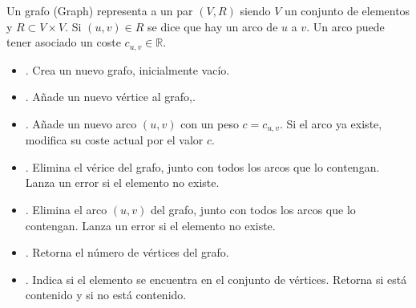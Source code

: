 

\begin{definition}[Grafo]{}\label{def:Grafo}

Un grafo  (Graph) representa a un par $(V, R)$ siendo $V$ un conjunto de elementos y $R\subset V\times V$.
Si $(u, v)\in R$ se dice que hay un arco de $u$ a $v$. Un arco puede tener asociado un coste $c_{u, v}\in \mathbb{R}$.

\begin{itemize}
\item {}. Crea un nuevo grafo, inicialmente vacío.


\item {}. Añade un nuevo vértice al grafo,.

\item {}. Añade un nuevo arco $(u, v)$ con un peso  $c=c_{u, v}$. Si el arco ya existe, modifica su coste actual por el valor $c$.

\item {}. Elimina el vérice  del grafo, junto con todos los arcos que lo contengan. Lanza un error si el elemento no existe.

\item {}. Elimina el arco $(u, v)$ del grafo, junto con todos los arcos que lo contengan. Lanza un error si el elemento no existe.

\item {}. Retorna el número de vértices del grafo.

\item {}. Indica si el elemento  se encuentra en el conjunto de vértices. Retorna  si está contenido y  si no está contenido.

\end{itemize}
\end{definition}

